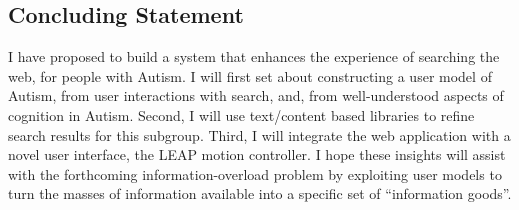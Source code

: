 \documentclass[a4paper, 11pt]{article}
\begin{document}
\begin{justify}
\section{Concluding Statement}\label{future}
I have proposed to build a system that enhances the experience of searching the web, for people with Autism. I will first set about constructing a user model of Autism, from user interactions with search, and, from well-understood aspects of cognition in Autism. Second, I will use text/content based libraries to refine search results for this subgroup. Third, I will integrate the web application with a novel user interface, the LEAP motion controller. I hope these insights will assist with the forthcoming information-overload problem by exploiting user models to turn the masses of information available into a specific set of “information goods”.

\end{justify}
\end{document}
